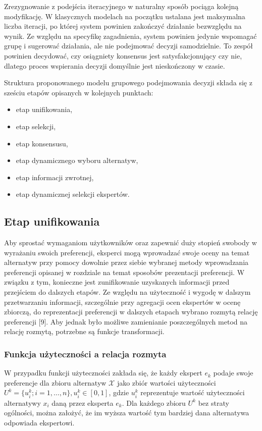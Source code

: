 Zrezygnowanie z podejścia iteracyjnego w naturalny sposób pociąga kolejną
modyfikację. W klasycznych modelach na początku ustalana jest maksymalna liczba
iteracji, po której system powinien zakończyć działanie bezwzględu na wynik.
Ze względu na specyfikę zagadnienia, system powinien jedynie wspomagać grupę i
sugerować działania, ale nie podejmować decyzji samodzielnie. To zespół powinien
decydować, czy osiągniety konsensus jest satysfakcjonujący czy nie, dlatego
proces wspierania decyzji domyślnie jest nieskończony w czasie.

Struktura proponowanego modelu grupowego podejmowania decyzji składa się z
sześciu etapów opisanych w kolejnych punktach:
\begin{itemize}
  \item etap unifikowania,
  \item etap selekcji,
  \item etap konsensusu,
  \item etap dynamicznego wyboru alternatyw,
  \item etap informacji zwrotnej,
  \item etap dynamicznej selekcji ekspertów.
\end{itemize}


\subsection{Etap unifikowania}
Aby sprostać wymaganiom użytkowników oraz zapewnić duży stopień swobody w
wyrażaniu swoich preferencji, eksperci mogą wprowadzać swoje oceny na temat
alternatyw przy pomocy dowolnie przez siebie wybranej metody wprowadzania
preferencji opisanej w rozdziale na temat sposobów prezentacji preferencji. W
związku z tym, konieczne jest zunifikowanie uzyskanych informacji przed
przejściem do dalszych etapów. Ze względu na użyteczność i wygodę w dalszym
przetwarzaniu informacji, szczególnie przy agregacji ocen ekspertów w ocenę
zbiorczą, do reprezentacji preferencji w dalszych etapach wybrano rozmytą
relację preferencji [9]. Aby jednak było możliwe zamienianie poszczególnych
metod na relację rozmytą, potrzebne są funkcje transformacji.

\subsubsection{Funkcja użyteczności a relacja rozmyta}
W przypadku funkcji użyteczności zakłada się, że każdy ekspert $e_k$ podaje
swoje preferencje dla zbioru alternatyw $\mathcal{X}$ jako zbiór wartości
użyteczności $U^k = \{ u^k_i; i=1,\dotsc,n\}, u^k_i \in [0,1]$, gdzie
$u^k_i$ reprezentuje wartość użyteczności alternatywy $x_i$ daną przez eksperta
$e_k$. Dla każdego zbioru $U^k$ bez straty ogólności, można założyć, że im
wyższa wartość tym bardziej dana alternatywa odpowiada ekspertowi.

